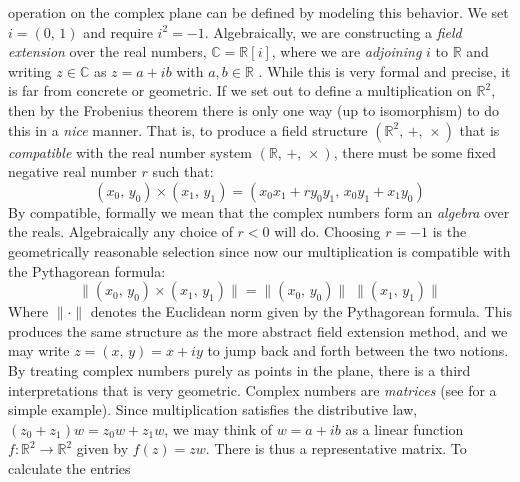 \documentclass{article}
\theoremstyle{definition}
\begin{document}
        operation on the complex plane can be defined by modeling this behavior.
        We set $i=(0,\,1)$ and require $i^{2}=-1$. Algebraically, we are
        constructing a \textit{field extension} over the real numbers,
        $\mathbb{C}=\mathbb{R}[i]$, where we are \textit{adjoining} $i$ to
        $\mathbb{R}$ and writing $z\in\mathbb{C}$ as $z=a+ib$ with
        $a,b\in\mathbb{R}$ \cite[p.~512]{DummitAndFooteAbstractAlgebra}.
        While this is very formal and precise, it is far from concrete or
        geometric. If we set out to define a multiplication on $\mathbb{R}^{2}$,
        then by the Frobenius theorem \cite[p.~452]{JacobsonBasicAlgebraI}
        there is only one way (up to isomorphism) to do this in a \textit{nice}
        manner. That is, to produce a field structure
        $(\mathbb{R}^{2},\,+,\,\times)$ that is \textit{compatible} with the
        real number system $(\mathbb{R},\,+,\,\times)$, there must be some
        fixed negative real number $r$ such that:
        \begin{equation}
            (x_{0},\,y_{0})\times(x_{1},\,y_{1})
            =(x_{0}x_{1}+ry_{0}y_{1},\,x_{0}y_{1}+x_{1}y_{0})
        \end{equation}
        By compatible, formally we mean that the complex numbers form an
        \textit{algebra} over the reals.
        Algebraically any choice of $r<0$ will do.
        Choosing $r=-1$ is the geometrically reasonable selection since now
        our multiplication is compatible with the Pythagorean formula:
        \begin{equation}
            \|(x_{0},\,y_{0})\times(x_{1},\,y_{1})\|
            =\|(x_{0},\,y_{0})\|\;\|(x_{1},\,y_{1})\|
        \end{equation}
        Where $\|\cdot\|$ denotes the Euclidean norm given by the
        Pythagorean formula. This produces the same structure as the more
        abstract field extension method, and we may write
        $z=(x,\,y)=x+iy$ to jump back and forth between the two notions.
        By treating complex numbers purely as points in the plane, there is
        a third interpretations that is very geometric. Complex numbers are
        \textit{matrices} (see \cite[p.~25]{PetersenLinearAlgebra} for a
        simple example). Since multiplication satisfies the
        distributive law, $(z_{0}+z_{1})w=z_{0}w+z_{1}w$, we may think of
        $w=a+ib$ as a linear function
        $f:\mathbb{R}^{2}\rightarrow\mathbb{R}^{2}$ given by $f(z)=zw$.
        There is thus a representative matrix. To calculate the entries
\end{document}
